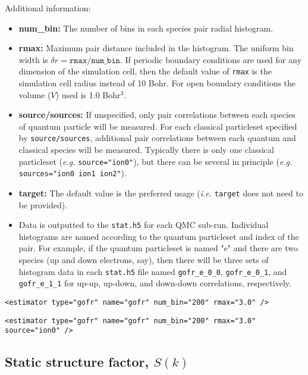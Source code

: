 Additional information:
\begin{itemize}
  \item{\textbf{num\_bin:} The number of bins in each species pair radial histogram.}
  \item{\textbf{rmax:} Maximum pair distance included in the histogram.  The uniform bin width is $\delta r=\texttt{rmax/num\_bin}$.  If periodic boundary conditions are used for any dimension of the simulation cell, then the default value of \texttt{rmax} is the simulation cell radius instead of 10 Bohr.  For open boundary conditions the volume ($V$) used is 1.0 Bohr$^3$.}
  \item{\textbf{source/sources:} If unspecified, only pair correlations between each species of quantum particle will be measured.  For each classical particleset specified by \texttt{source/sources}, additional pair correlations between each quantum and classical species will be measured.  Typically there is only one classical particleset (\textit{e.g.} \texttt{source="ion0"}), but there can be several in principle (\textit{e.g.} \texttt{sources="ion0 ion1 ion2"}).}
  \item{\textbf{target:} The default value is the preferred usage (\textit{i.e.} \texttt{target} does not need to be provided).}
  \item{Data is outputted to the \texttt{stat.h5} for each QMC sub-run.  Individual histograms are named according to the quantum particleset and index of the pair.  For example, if the quantum particleset is named "e" and there are two species (up and down electrons, say), then there will be three sets of histogram data in each \texttt{stat.h5} file named \texttt{gofr\_e\_0\_0},  \texttt{gofr\_e\_0\_1}, and  \texttt{gofr\_e\_1\_1} for up-up, up-down, and down-down correlations, respectively.}
\end{itemize}

\begin{lstlisting}[caption=Pair correlation function estimator element.]
  <estimator type="gofr" name="gofr" num_bin="200" rmax="3.0" />
\end{lstlisting}
\begin{lstlisting}[caption=Pair correlation function estimator element with additional electron-ion correlations.]
  <estimator type="gofr" name="gofr" num_bin="200" rmax="3.0" source="ion0" />
\end{lstlisting}


\subsection{Static structure factor, $S(k)$}

